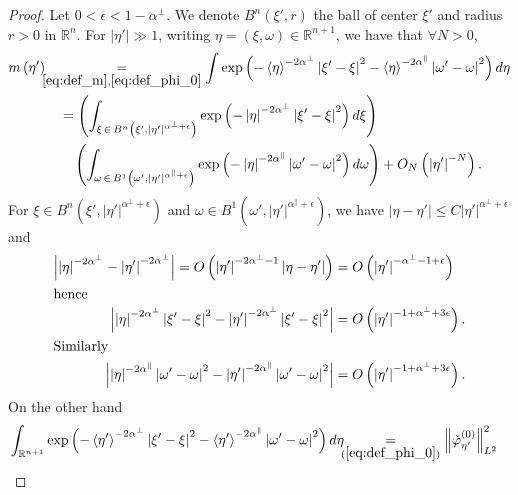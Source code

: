 \documentclass[10pt]{amsart}
\theoremstyle{definition}\newtheorem{defi}[theo]{Definition}\newtheorem{rema}[theo]{Remark}\newtheorem{exam}[theo]{Example}\newtheorem{exem}[theo]{Example}\newtheorem{nota}[theo]{Notation}
\newcommand*\eq[1]{\underset{(#1)}{=}}
\newcommand{\bbR}{\mathbb{R}}
\let\oldforall\forall
\renewcommand*{\forall}{\mathrel{\oldforall}}
\begin{document}
\begin{proof}
Let $0<\epsilon<1-\alpha^{\perp}$. We denote $B^{n}(\xi',r)$ the ball of center $\xi'$ and radius $r>0$ in $\bbR^{n}$. For $|\eta'|\gg1$, writing $\eta=(\xi,\omega)\in\bbR^{n+1}$, we have that $\forall N>0$,
\begin{align}\label{eq:expression_m}
m\left(\eta'\right)\quad & \mkern-27mu\underset{{\eqref{eq:def_m},\eqref{eq:def_phi_0}}}{=}\int\exp\left(-\left\langle \eta\right\rangle ^{-2\alpha^{\perp}}\left|\xi'-\xi\right|^{2}-\left\langle \eta\right\rangle ^{-2\alpha^{\parallel}}\left|\omega'-\omega\right|^{2}\right)d\eta
\\
& =\left(\int_{\xi\,\in\,B^{n}\left(\xi',\left|\eta'\right|^{\alpha^{\perp}+\epsilon}\right)}\exp\left(-\left|\eta\right|^{-2\alpha^{\perp}}\left|\xi'-\xi\right|^{2}\right)d\xi\right)\nonumber \\
& \quad\left(\int_{\omega\,\in\,B^{1}\left(\omega',\left|\eta'\right|^{\alpha^{\parallel}+\epsilon}\right)}\exp\left(-\left|\eta\right|^{-2\alpha^{\parallel}}\left|\omega'-\omega\right|^{2}\right)d\omega\right)+O_{N}\left(\left|\eta'\right|^{-N}\right).
\end{align}
For $\xi\in B^{n}(\xi',|\eta'|^{\alpha^{\perp}+\epsilon})$ and $\omega\in B^{1}(\omega',|\eta'|^{\alpha^{\parallel}+\epsilon})$, we have $|\eta-\eta'|\leq C|\eta'|^{\alpha^{\perp}+\epsilon}$ and
\begin{align*}
\left|\left|\eta\right|^{-2\alpha^{\perp}}-\left|\eta'\right|^{-2\alpha^{\perp}}\right|=O\left(\left|\eta'\right|^{-2\alpha^{\perp}-1}\left|\eta-\eta'\right|\right) &=O\left(\left|\eta'\right|^{-\alpha^{\perp}-1+\epsilon}\right)
\\
\intertext{hence}
\left|\left|\eta\right|^{-2\alpha^{\perp}}\left|\xi'-\xi\right|^{2}-\left|\eta'\right|^{-2\alpha^{\perp}}\left|\xi'-\xi\right|^{2}\right| &=O\left(\left|\eta'\right|^{-1+\alpha^{\perp}+3\epsilon}\right).
\\
\intertext{Similarly}
\left|\left|\eta\right|^{-2\alpha^{\parallel}}\left|\omega'-\omega\right|^{2}-\left|\eta'\right|^{-2\alpha^{\parallel}}\left|\omega'-\omega\right|^{2}\right| &=O\left(\left|\eta'\right|^{-1+\alpha^{\perp}+3\epsilon}\right).
\end{align*}
On the other hand
\begin{align*}
\mkern-15mu\int_{\bbR^{n+1}}\exp\left(-\left\langle \eta'\right\rangle ^{-2\alpha^{\perp}}\left|\xi'-\xi\right|^{2}-\left\langle \eta'\right\rangle ^{-2\alpha^{\parallel}}\left|\omega'-\omega\right|^{2}\right)d\eta &\!\!\!\eq{\ref{eq:def_phi_0}}\left\Vert \check{\varphi}_{\eta'}^{\left(0\right)}\right\Vert _{L^{2}}^{2}\\

\end{align*}
\end{proof}
\end{document}

